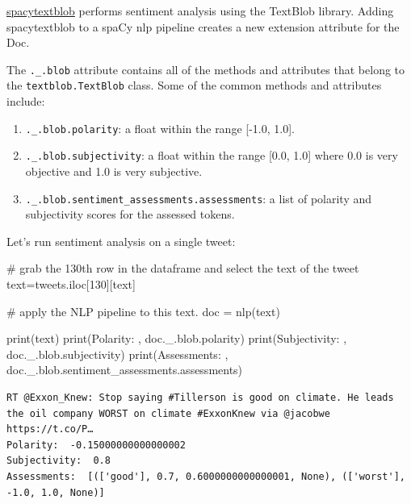 \documentclass[
  letterpaper,
  DIV=11,
  numbers=noendperiod]{scrreprt}
\newenvironment{Shaded}{\begin{snugshade}}{\end{snugshade}}
\newcommand{\BuiltInTok}[1]{\textcolor[rgb]{0.00,0.23,0.31}{#1}}
\newcommand{\CommentTok}[1]{\textcolor[rgb]{0.37,0.37,0.37}{#1}}
\newcommand{\DecValTok}[1]{\textcolor[rgb]{0.68,0.00,0.00}{#1}}
\newcommand{\NormalTok}[1]{\textcolor[rgb]{0.00,0.23,0.31}{#1}}
\newcommand{\OperatorTok}[1]{\textcolor[rgb]{0.37,0.37,0.37}{#1}}
\newcommand{\StringTok}[1]{\textcolor[rgb]{0.13,0.47,0.30}{#1}}
\providecommand{\tightlist}{%
  \setlength{\itemsep}{0pt}\setlength{\parskip}{0pt}}\usepackage{longtable,booktabs,array}
\begin{document}
\href{https://spacytextblob.netlify.app/}{spacytextblob} performs
sentiment analysis using the TextBlob library. Adding spacytextblob to a
spaCy nlp pipeline creates a new extension attribute for the Doc.

The \texttt{.\_.blob} attribute contains all of the methods and
attributes that belong to the \texttt{textblob.TextBlob} class. Some of
the common methods and attributes include:

\begin{enumerate}
\def\labelenumi{\arabic{enumi}.}
\tightlist
\item
  \texttt{.\_.blob.polarity}: a float within the range {[}-1.0, 1.0{]}.
\item
  \texttt{.\_.blob.subjectivity}: a float within the range {[}0.0,
  1.0{]} where 0.0 is very objective and 1.0 is very subjective.
\item
  \texttt{.\_.blob.sentiment\_assessments.assessments}: a list of
  polarity and subjectivity scores for the assessed tokens.
\end{enumerate}

Let's run sentiment analysis on a single tweet:

\begin{Shaded}
\begin{Highlighting}[]
\CommentTok{\# grab the 130th row in the dataframe and select the text of the tweet}
\NormalTok{text}\OperatorTok{=}\NormalTok{tweets.iloc[}\DecValTok{130}\NormalTok{][}\StringTok{\textquotesingle{}text\textquotesingle{}}\NormalTok{]}

\CommentTok{\# apply the NLP pipeline to this text.}
\NormalTok{doc }\OperatorTok{=}\NormalTok{ nlp(text)}

\BuiltInTok{print}\NormalTok{(text)}
\BuiltInTok{print}\NormalTok{(}\StringTok{\textquotesingle{}Polarity: \textquotesingle{}}\NormalTok{, doc.\_.blob.polarity)}
\BuiltInTok{print}\NormalTok{(}\StringTok{\textquotesingle{}Subjectivity: \textquotesingle{}}\NormalTok{, doc.\_.blob.subjectivity)}
\BuiltInTok{print}\NormalTok{(}\StringTok{\textquotesingle{}Assessments: \textquotesingle{}}\NormalTok{, doc.\_.blob.sentiment\_assessments.assessments)}
\end{Highlighting}
\end{Shaded}

\begin{verbatim}
RT @Exxon_Knew: Stop saying #Tillerson is good on climate. He leads the oil company WORST on climate #ExxonKnew via @jacobwe https://t.co/P…
Polarity:  -0.15000000000000002
Subjectivity:  0.8
Assessments:  [(['good'], 0.7, 0.6000000000000001, None), (['worst'], -1.0, 1.0, None)]
\end{verbatim}
\end{document}
